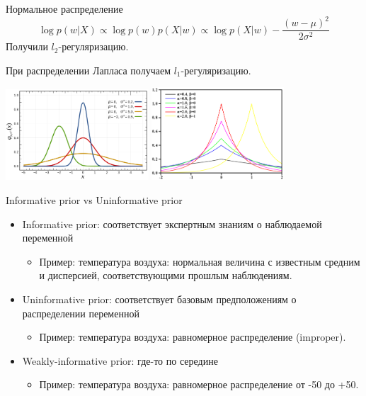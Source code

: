 \documentclass[9pt,pdf,utf8,hyperref={unicode},aspectratio=169]{beamer}
\begin{document}
\begin{frame}{Нормальное распределение}
\[
	\log p(w|X) \propto \log p(w)p(X|w) \propto \log p(X|w) - \frac{(w-\mu)^2}{2\sigma^{2}}
\]
Получили $l_2$-регуляризацию.

При распределении Лапласа получаем $l_1$-регуляризацию.


\includegraphics[width=0.4\textwidth]{gaus.png}
\includegraphics[width=0.37\textwidth]{laplace.png}


\end{frame}




\begin{frame}{Informative prior vs Uninformative prior}
\begin{itemize}
\item Informative prior: соответствует экспертным знаниям о наблюдаемой переменной 
\begin{itemize}
\item Пример: температура воздуха: нормальная величина с известным средним и дисперсией, соответствующими прошлым наблюдениям.
\end{itemize}

\item Uninformative prior: соответствует базовым предположениям о распределении переменной
\begin{itemize}
\item Пример: температура воздуха: равномерное распределение (improper).
\end{itemize}

\item Weakly-informative prior: где-то по середине
\begin{itemize}
\item Пример: температура воздуха: равномерное распределение от -50 до +50.
\end{itemize}


\end{itemize}


\end{frame}
\end{document}
